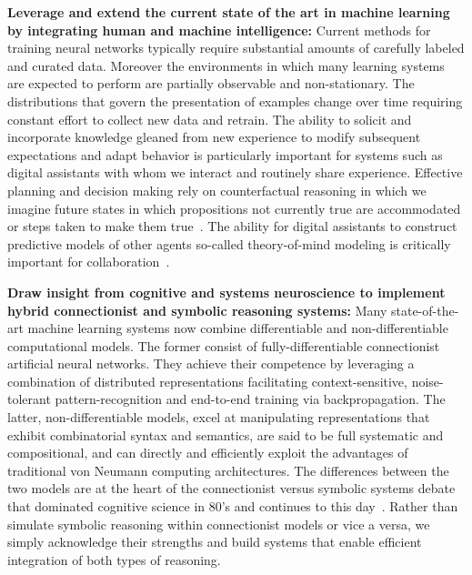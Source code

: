 {\bf{Leverage and extend the current state of the art in machine learning by integrating human and machine intelligence:}} Current methods for training neural networks typically require substantial amounts of carefully labeled and curated data. Moreover the environments in which many learning systems are expected to perform are partially observable and non-stationary. The distributions that govern the presentation of examples change over time requiring constant effort to collect new data and retrain. The ability to solicit and incorporate knowledge gleaned from new experience to modify subsequent expectations and adapt behavior is particularly important for systems such as digital assistants with whom we interact and routinely share experience. Effective planning and decision making rely on counterfactual reasoning in which we imagine future states in which propositions not currently true are accommodated or steps taken to make them true~\cite{HassabisandMaguireTiCS-07}. The ability for digital assistants to construct predictive models of other agents \emdash{} so-called theory-of-mind modeling \emdash{} is critically important for collaboration~\cite{RabinowitzetalCoRR-18}.


{\bf{Draw insight from cognitive and systems neuroscience to implement hybrid connectionist and symbolic reasoning systems:}} Many state-of-the-art machine learning systems now combine differentiable and non-differentiable computational models. The former consist of fully-differentiable connectionist artificial neural networks. They achieve their competence by leveraging a combination of distributed representations facilitating context-sensitive, noise-tolerant pattern-recognition and end-to-end training via backpropagation. The latter, non-differentiable models, excel at manipulating representations that exhibit combinatorial syntax and semantics, are said to be full systematic and compositional, and can directly and efficiently exploit the advantages of traditional von Neumann computing architectures. The differences between the two models are at the heart of the connectionist versus symbolic systems debate that dominated cognitive science in 80's and continues to this day~\cite{OReillyetalTACO-14,FodorandPylyshynCOGNITION-88}. Rather than simulate symbolic reasoning within connectionist models or vice a versa, we simply acknowledge their strengths and build systems that enable efficient integration of both types of reasoning.


